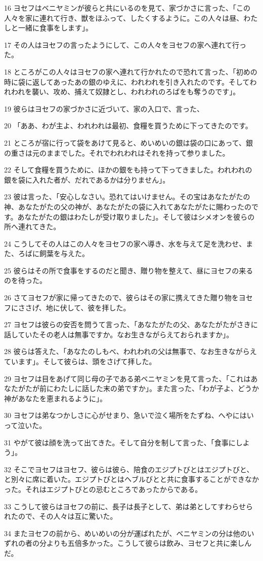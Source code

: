 \par 16 ヨセフはベニヤミンが彼らと共にいるのを見て、家づかさに言った、「この人々を家に連れて行き、獣をほふって、したくするように。この人々は昼、わたしと一緒に食事をします」。
\par 17 その人はヨセフの言ったようにして、この人々をヨセフの家へ連れて行った。
\par 18 ところがこの人々はヨセフの家へ連れて行かれたので恐れて言った、「初めの時に袋に返してあったあの銀のゆえに、われわれを引き入れたのです。そしてわれわれを襲い、攻め、捕えて奴隷とし、われわれのろばをも奪うのです」。
\par 19 彼らはヨセフの家づかさに近づいて、家の入口で、言った、
\par 20 「ああ、わが主よ、われわれは最初、食糧を買うために下ってきたのです。
\par 21 ところが宿に行って袋をあけて見ると、めいめいの銀は袋の口にあって、銀の重さは元のままでした。それでわれわれはそれを持って参りました。
\par 22 そして食糧を買うために、ほかの銀をも持って下ってきました。われわれの銀を袋に入れた者が、だれであるかは分りません」。
\par 23 彼は言った、「安心しなさい。恐れてはいけません。その宝はあなたがたの神、あなたがたの父の神が、あなたがたの袋に入れてあなたがたに賜わったのです。あなたがたの銀はわたしが受け取りました」。そして彼はシメオンを彼らの所へ連れてきた。
\par 24 こうしてその人はこの人々をヨセフの家へ導き、水を与えて足を洗わせ、また、ろばに飼葉を与えた。
\par 25 彼らはその所で食事をするのだと聞き、贈り物を整えて、昼にヨセフの来るのを待った。
\par 26 さてヨセフが家に帰ってきたので、彼らはその家に携えてきた贈り物をヨセフにささげ、地に伏して、彼を拝した。
\par 27 ヨセフは彼らの安否を問うて言った、「あなたがたの父、あなたがたがさきに話していたその老人は無事ですか。なお生きながらえておられますか」。
\par 28 彼らは答えた、「あなたのしもべ、われわれの父は無事で、なお生きながらえています」。そして彼らは、頭をさげて拝した。
\par 29 ヨセフは目をあげて同じ母の子である弟ベニヤミンを見て言った、「これはあなたがたが前にわたしに話した末の弟ですか」。また言った、「わが子よ、どうか神があなたを恵まれるように」。
\par 30 ヨセフは弟なつかしさに心がせまり、急いで泣く場所をたずね、へやにはいって泣いた。
\par 31 やがて彼は顔を洗って出てきた。そして自分を制して言った、「食事にしよう」。
\par 32 そこでヨセフはヨセフ、彼らは彼ら、陪食のエジプトびとはエジプトびと、と別々に席に着いた。エジプトびとはヘブルびとと共に食事することができなかった。それはエジプトびとの忌むところであったからである。
\par 33 こうして彼らはヨセフの前に、長子は長子として、弟は弟としてすわらせられたので、その人々は互に驚いた。
\par 34 またヨセフの前から、めいめいの分が運ばれたが、ベニヤミンの分は他のいずれの者の分よりも五倍多かった。こうして彼らは飲み、ヨセフと共に楽しんだ。

